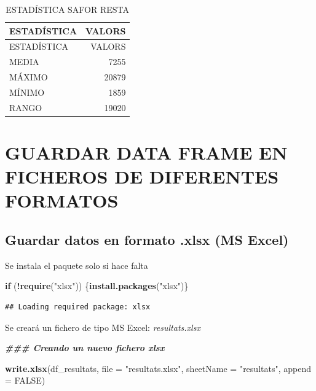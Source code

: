 \documentclass[
]{article}
\newenvironment{Shaded}{\begin{snugshade}}{\end{snugshade}}
\newcommand{\AttributeTok}[1]{\textcolor[rgb]{0.13,0.29,0.53}{#1}}
\newcommand{\ConstantTok}[1]{\textcolor[rgb]{0.56,0.35,0.01}{#1}}
\newcommand{\ControlFlowTok}[1]{\textcolor[rgb]{0.13,0.29,0.53}{\textbf{#1}}}
\newcommand{\DocumentationTok}[1]{\textcolor[rgb]{0.56,0.35,0.01}{\textbf{\textit{#1}}}}
\newcommand{\FunctionTok}[1]{\textcolor[rgb]{0.13,0.29,0.53}{\textbf{#1}}}
\newcommand{\NormalTok}[1]{#1}
\newcommand{\SpecialCharTok}[1]{\textcolor[rgb]{0.81,0.36,0.00}{\textbf{#1}}}
\newcommand{\StringTok}[1]{\textcolor[rgb]{0.31,0.60,0.02}{#1}}
\begin{document}
\begin{longtable}[]{@{}lr@{}}
\caption{ESTADÍSTICA SAFOR RESTA}\tabularnewline
\toprule\noalign{}
ESTADÍSTICA & VALORS \\
\midrule\noalign{}
\endfirsthead
\toprule\noalign{}
ESTADÍSTICA & VALORS \\
\midrule\noalign{}
\endhead
\bottomrule\noalign{}
\endlastfoot
MEDIA & 7255 \\
MÁXIMO & 20879 \\
MÍNIMO & 1859 \\
RANGO & 19020 \\
\end{longtable}

\hypertarget{guardar-data-frame-en-ficheros-de-diferentes-formatos}{%
\section{GUARDAR DATA FRAME EN FICHEROS DE DIFERENTES
FORMATOS}\label{guardar-data-frame-en-ficheros-de-diferentes-formatos}}

\hypertarget{guardar-datos-en-formato-.xlsx-ms-excel}{%
\subsection{Guardar datos en formato .xlsx (MS
Excel)}\label{guardar-datos-en-formato-.xlsx-ms-excel}}

Se instala el paquete solo si hace falta

\begin{Shaded}
\begin{Highlighting}[]
\ControlFlowTok{if}\NormalTok{ (}\SpecialCharTok{!}\FunctionTok{require}\NormalTok{(}\StringTok{"xlsx"}\NormalTok{)) \{}\FunctionTok{install.packages}\NormalTok{(}\StringTok{"xlsx"}\NormalTok{)\}}
\end{Highlighting}
\end{Shaded}

\begin{verbatim}
## Loading required package: xlsx
\end{verbatim}

Se creará un fichero de tipo MS Excel: \emph{resultats.xlsx}

\begin{Shaded}
\begin{Highlighting}[]
\DocumentationTok{\#\#\# Creando un nuevo fichero xlsx}

\FunctionTok{write.xlsx}\NormalTok{(df\_resultats, }\AttributeTok{file =} \StringTok{"resultats.xlsx"}\NormalTok{, }\AttributeTok{sheetName =} \StringTok{"resultats"}\NormalTok{, }\AttributeTok{append =} \ConstantTok{FALSE}\NormalTok{)}
\end{Highlighting}
\end{Shaded}
\end{document}
